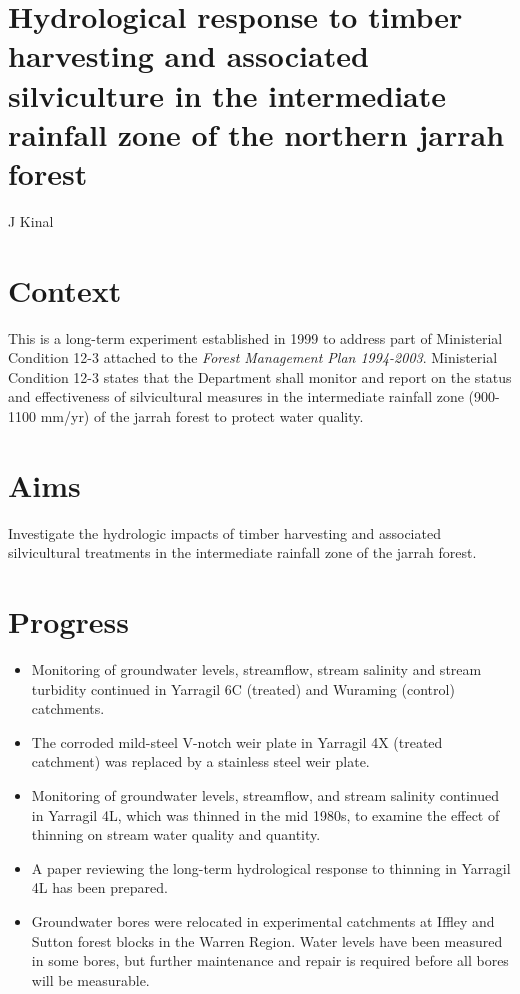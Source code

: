 \documentclass[version=last,
    paper=a4, %
    10pt, %
    usenames,
    dvipsnames,
    oneside, %
    headings=openany, %
    DIV=15 %
]{scrbook}
\begin{document}
\section*{Hydrological response to timber harvesting and associated silviculture
in the intermediate rainfall zone of the northern jarrah forest
}

J Kinal


\section*{Context}
This is a long-term experiment established in 1999 to address part of
Ministerial Condition 12-3 attached to the \emph{Forest Management Plan
1994-2003}. Ministerial Condition 12-3 states that the Department shall
monitor and report on the status and effectiveness of silvicultural
measures in the intermediate rainfall zone (900-1100 mm/yr) of the
jarrah forest to protect water quality.



\section*{Aims}
Investigate the hydrologic impacts of timber harvesting and associated
silvicultural treatments in the intermediate rainfall zone of the jarrah
forest.



\section*{Progress}
\begin{itemize}
\itemsep1pt\parskip0pt
\item
  Monitoring of groundwater levels, streamflow, stream salinity and
  stream turbidity continued in Yarragil 6C (treated) and Wuraming
  (control) catchments.
\item
  The corroded mild-steel V-notch weir plate in Yarragil 4X (treated
  catchment) was replaced by a stainless steel weir plate.~
\item
  Monitoring of groundwater levels, streamflow, and stream salinity
  continued in Yarragil 4L, which was thinned in the mid 1980s, to
  examine the effect of thinning on stream water quality and quantity.
\item
  A paper reviewing the long-term hydrological response to thinning in
  Yarragil 4L has been prepared.
\item
  Groundwater bores were relocated in experimental catchments at Iffley
  and Sutton forest blocks in the Warren Region. Water levels have been
  measured in some bores, but further maintenance and repair is required
  before all bores will be measurable.
\end{itemize}
\end{document}
